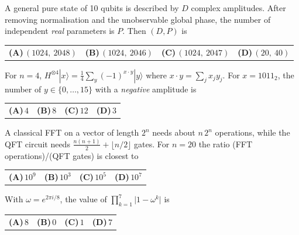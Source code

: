 \documentclass[11pt,a4paper]{article}
\newcommand{\optlabel}[1]{\textbf{(#1)}}
\newenvironment{qitem}[1]{\begin{list}{}{\setlength{\leftmargin}{3.3em}\setlength{\labelwidth}{3.1em}%
  \setlength{\labelsep}{0.2em}\setlength{\topsep}{3pt}\setlength{\parsep}{3pt}}\item[\textbf{Q.#1}\hfill]}{\end{list}}
\newcommand{\qsep}{\par\vspace{2pt}{\color{black!15}\hrule}\vspace{4pt}}
\begin{document}
\begin{qitem}{9}
A general pure state of 10 qubits is described by $D$ complex amplitudes. After removing normalisation and
the unobservable global phase, the number of independent \emph{real} parameters is $P$. Then $(D, P)$ is
\par\smallskip\noindent\begin{tabularx}{\linewidth}{@{}*{4}{L}@{}}
\optlabel{A}\,$(1024,\ 2048)$ & \optlabel{B}\,$(1024,\ 2046)$ & \optlabel{C}\,$(1024,\ 2047)$ & \optlabel{D}\,$(20,\ 40)$
\end{tabularx}
\end{qitem}
\qsep

\begin{qitem}{10}
For $n = 4$, $H^{\otimes 4}|x\rangle = \frac14\sum_{y}(-1)^{x\cdot y}|y\rangle$ where $x\cdot y = \sum_j x_jy_j$.
For $x = 1011_2$, the number of $y \in \{0,\dots,15\}$ with a \emph{negative} amplitude is
\par\smallskip\noindent\begin{tabularx}{\linewidth}{@{}*{4}{L}@{}}
\optlabel{A}\,$4$ & \optlabel{B}\,$8$ & \optlabel{C}\,$12$ & \optlabel{D}\,$3$
\end{tabularx}
\end{qitem}
\qsep

\begin{qitem}{11}
A classical FFT on a vector of length $2^n$ needs about $n\,2^n$ operations, while the QFT circuit needs
$\frac{n(n+1)}{2} + \lfloor n/2\rfloor$ gates. For $n = 20$ the ratio (FFT operations)/(QFT gates) is closest to
\par\smallskip\noindent\begin{tabularx}{\linewidth}{@{}*{4}{L}@{}}
\optlabel{A}\,$10^{9}$ & \optlabel{B}\,$10^{3}$ & \optlabel{C}\,$10^{5}$ & \optlabel{D}\,$10^{7}$
\end{tabularx}
\end{qitem}
\qsep

\begin{qitem}{12}
With $\omega = e^{2\pi i/8}$, the value of $\displaystyle\prod_{k=1}^{7}\big|1 - \omega^{k}\big|$ is
\par\smallskip\noindent\begin{tabularx}{\linewidth}{@{}*{4}{L}@{}}
\optlabel{A}\,$8$ & \optlabel{B}\,$0$ & \optlabel{C}\,$1$ & \optlabel{D}\,$7$
\end{tabularx}
\end{qitem}
\qsep
\end{document}
